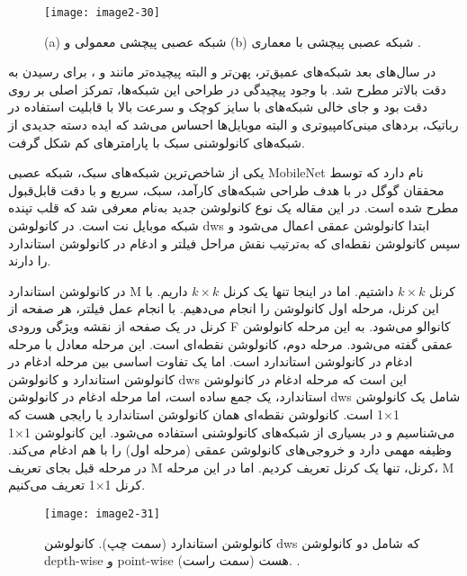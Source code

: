 \begin{figure}[h]
\centering
  \texttt{[image: image2-30]}
  \caption{(a) شبکه عصبی پیچشی معمولی و (b) شبکه عصبی پیچشی با معماری  \cite{ref1}.}
  \label{image2-30}
\end{figure}

\noindent
در سال‌های بعد شبکه‌های عمیق‌تر، پهن‌تر و البته پیچیده‌تر مانند   و ،  برای رسیدن به دقت بالاتر مطرح شد. با وجود پیچیدگی در طراحی این شبکه‌ها، تمرکز اصلی ‌بر روی دقت بود و جای خالی شبکه‌های با سایز کوچک و سرعت بالا با قابلیت استفاده در رباتیک، بردهای مینی‌کامپیوتری و البته موبایل‌ها احساس می‌شد که ایده دسته جدیدی از شبکه‌های کانولوشنی سبک با پارامترهای کم‌ شکل گرفت. 

\noindent
یکی از شاخص‌ترین شبکه‌های سبک، شبکه عصبی MobileNet نام دارد که توسط محققان گوگل در \cite{howard2017mobilenets} با هدف طراحی شبکه‌های کارآمد، سبک، سریع و با دقت قابل‌قبول مطرح شده است. در این مقاله یک نوع کانولوشن جدید به‌نام  معرفی شد که قلب تپنده شبکه موبایل نت است. در کانولوشن dws ابتدا کانولوشن عمقی اعمال می‌شود و سپس کانولوشن نقطه‌ای که به‌ترتیب نقش مراحل فیلتر و ادغام در کانولوشن استاندارد را دارند. 

\noindent
در کانولوشن استاندارد M کرنل $k \times k$ داشتیم. اما در اینجا تنها یک کرنل $k \times k$ داریم. با این کرنل، مرحله اول کانولوشن را انجام می‌دهیم. با انجام عمل فیلتر، هر صفحه از کرنل در یک صفحه از نقشه ویژگی ورودی F کانوالو می‌شود. به این مرحله کانولوشن عمقی گفته می‌شود.  مرحله دوم، کانولوشن نقطه‌ای  است. این مرحله معادل با مرحله ادغام در کانولوشن استاندارد است. اما یک تفاوت اساسی بین مرحله ادغام در کانولوشن استاندارد و کانولوشن dws این است که مرحله ادغام در کانولوشن استاندارد، یک جمع ساده است، اما مرحله ادغام در کانولوشن dws شامل یک کانولوشن 1×1 است. کانولوشن نقطه‌ای همان کانولوشن استاندارد یا رایجی هست که می‌شناسیم و در بسیاری از شبکه‌های کانولوشنی استفاده می‌شود. این کانولوشن 1×1 وظیفه مهمی دارد و خروجی‌های کانولوشن عمقی (مرحله اول) را با هم ادغام می‌کند. در مرحله قبل بجای تعریف M کرنل، تنها یک کرنل تعریف کردیم. اما در این مرحله، M کرنل 1×1 تعریف می‌کنیم.

\begin{figure}[h]
\centering
  \texttt{[image: image2-31]}
  \caption{
  کانولوشن استاندارد (سمت چپ). کانولوشن dws که شامل دو کانولوشن depth-wise و point-wise هست (سمت راست). 
   \cite{howard2017mobilenets}.}
  \label{image2-31}
\end{figure}

